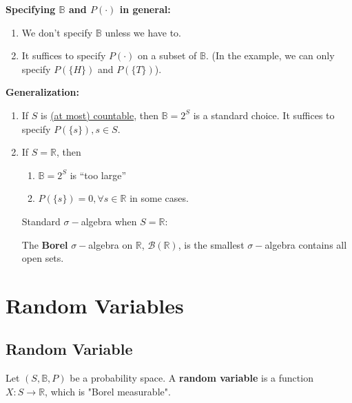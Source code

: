 \documentclass[11pt]{elegantbook}
\begin{document}
\begin{note}
    \textbf{Specifying $\mathbb{B}$ and $P(\cdot)$ in general:}
    \begin{enumerate}
        \item We don't specify $\mathbb{B}$ unless we have to.
        \item It suffices to specify $P(\cdot)$ on a subset of $\mathbb{B}$. (In the example, we can only specify $P(\{H\})$ and $P(\{T\})$).
    \end{enumerate}
\end{note}
\begin{note}
    \textbf{Generalization:}
    \begin{enumerate}
        \item If $S$ is \underline{(at most) countable}, then $\mathbb{B}=2^S$ is a standard choice. It suffices to specify $P(\{s\}), s\in S$.
        \item If $S=\mathbb{R}$, then
        \begin{enumerate}
            \item $\mathbb{B}=2^S$ is ``too large''
            \item $P(\{s\})=0, \forall s\in \mathbb{R}$ in some cases.
        \end{enumerate}
        Standard $\sigma-$algebra when $S=\mathbb{R}$:
        \begin{definition}
            \normalfont
            The \textbf{Borel} $\sigma-$algebra on $\mathbb{R}$, $\mathcal{B}(\mathbb{R})$, is the smallest $\sigma-$algebra contains all open sets.
        \end{definition}
    \end{enumerate}
\end{note}

\section{Random Variables}

\subsection{Random Variable}
\begin{definition}
    \normalfont
    Let $(S,\mathbb{B},P)$ be a probability space. A \textbf{random variable} is a function $X: S \rightarrow \mathbb{R}$, which is "Borel measurable".
\end{definition}
\end{document}
